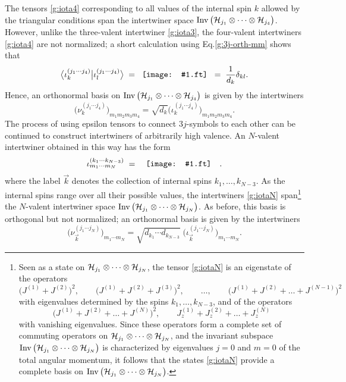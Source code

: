 \documentclass[graybox, secnum]{svmult}
\makeatletter
\newcommand{\ft}{pdf}        %
\newcommand{\makeSymbol}[1]{\mathord{\vcenter{\hbox{#1}}}}
\newcommand{\Symbol}[1]{\makeSymbol{\texttt{[image: \#1.\\ft]}}}
\newcommand{\bbraket}[2]{\bigl\langle #1 \big| #2 \bigr\rangle}
\newcommand{\Eq}[1]{Eq.\@\xspace\eqref{#1}}
\makeatother
\begin{document}
The tensors \eqref{g:iota4} corresponding to all values of the internal spin $k$ allowed by the triangular conditions span the intertwiner space ${\rm Inv}\,\bigl({\cal H}_{j_1}\otimes\cdots\otimes{\cal H}_{j_4}\bigr)$. However, unlike the three-valent intertwiner \eqref{g:iota3}, the four-valent intertwiners \eqref{g:iota4} are not normalized; a short calculation using \Eq{g:3j-orth-mm} shows that
\begin{equation}
	\bbraket{\iota^{(j_1\cdots j_4)}_k}{\iota^{(j_1\cdots j_4)}_l} \; = \;\; \Symbol{iota4-product} \;\; = \; \frac{1}{d_k}\delta_{kl}.
	\label{iota4-norm}
\end{equation}
Hence, an orthonormal basis on ${\rm Inv}\,\bigl({\cal H}_{j_1}\otimes\cdots\otimes{\cal H}_{j_4}\bigr)$ is given by the intertwiners
\vspace{-4pt}
\begin{equation}
	\bigl(\nu^{(j_1\cdots j_4)}_k\bigr)_{m_1m_2m_3m_4} = \sqrt{d_k}\bigl(\iota^{(j_1\cdots j_4)}_k\bigr)_{m_1m_2m_3m_4}.
	\label{}
\end{equation}
The process of using epsilon tensors to connect $3j$-symbols to each other can be continued to construct intertwiners of arbitrarily high valence. An $N$-valent intertwiner obtained in this way has the form
\begin{equation}
	\iota^{(k_1\cdots k_{N-3})}_{m_1\cdots m_N} \; = \quad \Symbol{iotaN} \quad . \vspace{-16pt}
	\label{g:iotaN}
\end{equation}
where the label $\vec k$ denotes the collection of internal spins $k_1, \dots, k_{N-3}$. As the internal spins range over all their possible values, the intertwiners \eqref{g:iotaN} span\footnote{
Seen as a state on ${\cal H}_{j_1}\otimes\cdots\otimes{\cal H}_{j_N}$, the tensor \eqref{g:iotaN} is an eigenstate of the operators
\[
	\bigl(J^{(1)} + J^{(2)}\bigr)^2, \qquad \bigl(J^{(1)} + J^{(2)} + J^{(3)}\bigr)^2, \qquad \dots, \qquad \bigl(J^{(1)} + J^{(2)} + \dots + J^{(N-1)}\bigr)^2
\]
with eigenvalues determined by the spins $k_1, \dots, k_{N-3}$, and of the operators
\[
	\bigl(J^{(1)} + J^{(2)} + \dots + J^{(N)}\bigr)^2, \qquad J^{(1)}_z + J^{(2)}_z + \dots + J^{(N)}_z
\]
with vanishing eigenvalues. Since these operators form a complete set of commuting operators on ${\cal H}_{j_1}\otimes\cdots\otimes{\cal H}_{j_N}$, and the invariant subspace ${\rm Inv}\,\bigl({\cal H}_{j_1}\otimes\cdots\otimes{\cal H}_{j_N}\bigr)$ is characterized by eigenvalues $j=0$ and $m=0$ of the total angular momentum, it follows that the states \eqref{g:iotaN} provide a complete basis on ${\rm Inv}\,\bigl({\cal H}_{j_1}\otimes\cdots\otimes{\cal H}_{j_N}\bigr)$.
}
the $N$-valent intertwiner space ${\rm Inv}\,\bigl({\cal H}_{j_1}\otimes\cdots\otimes{\cal H}_{j_N}\bigr)$. As before, this basis is orthogonal but not normalized; an orthonormal basis is given by the intertwiners
\begin{equation}
	\bigl(\nu^{(j_1\cdots j_N)}_{\vec k}\bigr)_{m_1\cdots m_N} = \sqrt{d_{k_1}\cdots d_{k_{N-3}}}\;\bigl(\iota^{(j_1\cdots j_N)}_{\vec k}\bigr)_{m_1\cdots m_N}.
	\label{}
\end{equation}
\end{document}
